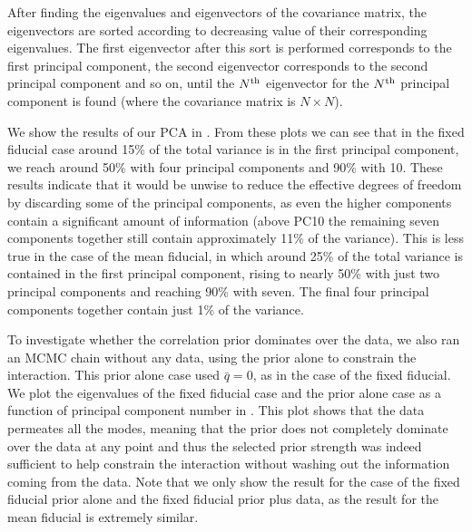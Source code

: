 \documentclass[final,3p,times,twocolumn]{elsarticle}
\begin{document}
After finding the eigenvalues and eigenvectors of the covariance matrix, the eigenvectors are sorted according to decreasing value of their corresponding eigenvalues. The first eigenvector after this sort is performed corresponds to the first principal component, the second eigenvector corresponds to the second principal component and so on, until the $N^{\rm th}$ eigenvector for the  $N^{\rm th}$ principal component is found (where the covariance matrix is $N \times N$).

We show the results of our PCA in . From these plots we can see that in the fixed fiducial case around 15\% of the total variance is in the first principal component, we reach around 50\% with four principal components and 90\% with 10. These results indicate that it would be unwise to reduce the effective degrees of freedom by discarding some of the principal components, as even the higher components contain a significant amount of information (above PC10 the remaining seven components together still contain approximately 11\% of the variance). This is less true in the case of the mean fiducial, in which around 25\% of the total variance is contained in the first principal component, rising to nearly 50\% with just two principal components and reaching 90\% with seven. The final four principal components together contain just 1\% of the variance.

To investigate whether the correlation prior dominates over the data, we also ran an MCMC chain without any data, using the prior alone to constrain the interaction. This prior alone case used $\bar{q}=0$, as in the case of the fixed fiducial. We plot the eigenvalues of the fixed fiducial case and the prior alone case as a function of principal component number in . This plot shows that the data permeates all the modes, meaning that the prior does not completely dominate over the data at any point and thus the selected prior strength was indeed sufficient to help constrain the interaction without washing out the information coming from the data. Note that we only show the result for the case of the fixed fiducial prior alone and the fixed fiducial prior plus data, as the result for the mean fiducial is extremely similar. %
\end{document}
